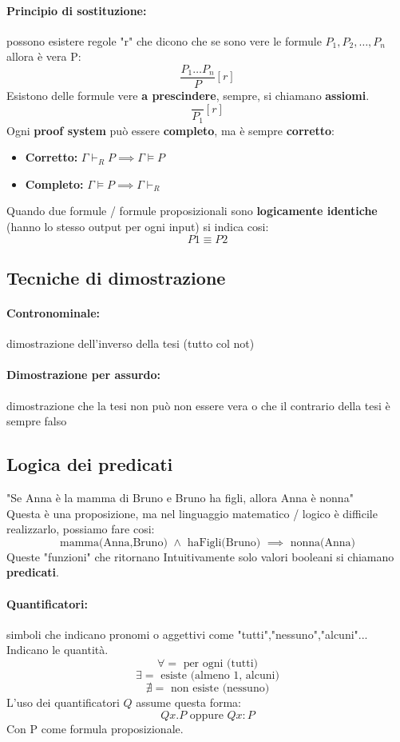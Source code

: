 \documentclass[a4paper,12pt]{article}
\begin{document}
\paragraph{Principio di sostituzione: } possono esistere regole "r" che dicono che se sono vere le formule $P_1,P_2,\ldots,P_n$ allora è vera P:
\[
\frac{P_1 \ldots P_n}{P}[r]
\]
Esistono delle formule vere \textbf{a prescindere}, sempre, si chiamano \textbf{assiomi}.
\[
\frac{}{P_1}[r]
\]
Ogni \textbf{proof system} può essere \textbf{completo}, ma è sempre \textbf{corretto}:
\begin{itemize}
    \item \textbf{Corretto: }$\Gamma \vdash _R P \implies \Gamma \models P$
    \item \textbf{Completo: }$\Gamma \models P \implies \Gamma \vdash _R$
\end{itemize}
Quando due formule / formule proposizionali sono \textbf{logicamente identiche} (hanno lo stesso output per ogni input) si indica cosi:
\[
P1 \equiv P2
\]
\subsection{Tecniche di dimostrazione}
\paragraph{Contronominale: } dimostrazione dell'inverso della tesi (tutto col not)
\paragraph{Dimostrazione per assurdo: } dimostrazione che la tesi non può non essere vera o che il contrario della tesi è sempre falso
\subsection{Logica dei predicati}
"Se Anna è la mamma di Bruno e Bruno ha figli, allora Anna è nonna"\\
Questa è una proposizione, ma nel linguaggio matematico / logico è difficile realizzarlo, possiamo fare cosi:
\[
\text{mamma(Anna,Bruno) } \land \text{ haFigli(Bruno) } \implies \text{ nonna(Anna)}
\]
Queste "funzioni" che ritornano Intuitivamente solo valori booleani si chiamano \textbf{predicati}.
\paragraph{Quantificatori:} simboli che indicano pronomi o aggettivi come "tutti","nessuno","alcuni"...\\
Indicano le quantità.
\[
\forall = \text{ per ogni (tutti)}
\]
\[
\exists = \text{ esiste (almeno 1, alcuni)}
\]
\[
\nexists = \text{ non esiste (nessuno)}
\]
L'uso dei quantificatori $Q$ assume questa forma:
\[
Qx . P \text{ oppure } Qx : P
\]
Con P come formula proposizionale.
\end{document}
